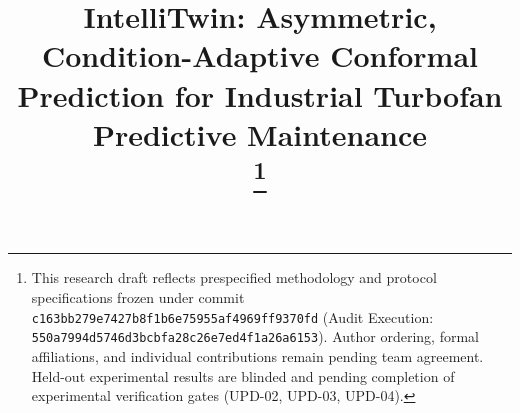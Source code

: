 \documentclass[conference]{IEEEtran}
\begin{document}
\title{IntelliTwin: Asymmetric, Condition-Adaptive Conformal Prediction for Industrial Turbofan Predictive Maintenance\\
\thanks{This research draft reflects prespecified methodology and protocol specifications frozen under commit \texttt{c163bb279e7427b8f1b6e75955af4969ff9370fd} (Audit Execution: \texttt{550a7994d5746d3bcbfa28c26e7ed4f1a26a6153}). Author ordering, formal affiliations, and individual contributions remain pending team agreement. Held-out experimental results are blinded and pending completion of experimental verification gates (UPD-02, UPD-03, UPD-04).}
}

\author{
\and
{}
\and
{}
}

\maketitle
\end{document}
